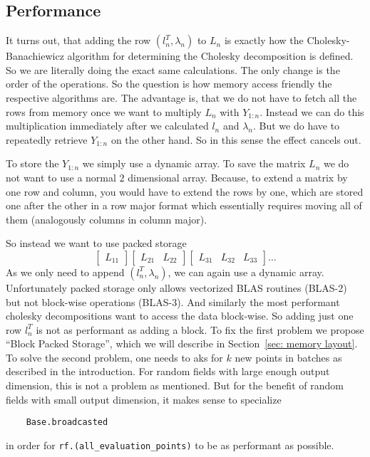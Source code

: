 \subsection{Performance}

It turns out, that adding the row \((l_n^T ,\lambda_n)\) to \(L_n\) is exactly
how the Cholesky-Banachiewicz algorithm for determining the Cholesky
decomposition is defined. So we are literally doing the exact same calculations.
The only change is the order of the operations. So the question is how memory
access friendly the respective algorithms are. The advantage is, that we do not
have to fetch all the rows from memory once we want to multiply
\(L_n\) with \(Y_{1:n}\). Instead we can do this multiplication immediately after
we calculated \(l_n\) and \(\lambda_n\). But we do have to repeatedly retrieve
\(Y_{1:n}\) on the other hand. So in this sense the effect cancels out.

To store the \(Y_{1:n}\) we simply use a dynamic array. To save the matrix \(L_n\)
we do not want to use a normal \(2\) dimensional array. Because, to extend a
matrix by one row and column, you would have to extend the rows by one, which
are stored one after the other in a row major format which essentially
requires moving all of them (analogously columns in column major).

So instead we want to use packed storage
\[
	\begin{bmatrix}
		L_{11}	
	\end{bmatrix}
	\begin{bmatrix}
		L_{21} & L_{22}
	\end{bmatrix}
	\begin{bmatrix}
		L_{31} & L_{32} & L_{33}
	\end{bmatrix}
	\dots
\]
As we only need to append \((l_n^T, \lambda_n)\), we can again use a dynamic
array. Unfortunately packed storage only allows vectorized BLAS routines
(BLAS-2) but not block-wise operations (BLAS-3). And similarly the most performant
cholesky decompositions want to access the data block-wise. So adding just one
row \(l_n^T\) is not as performant as adding a block. To fix the first problem
we propose ``Block Packed Storage'', which we will describe in Section~\ref{sec: memory
layout}. To solve the second problem, one needs to aks for \(k\) new points in
batches as described in the introduction. For random fields with large enough
output dimension, this is not a problem as mentioned. But for the benefit of
random fields with small output dimension, it makes sense to specialize
\begin{verbatim}
	Base.broadcasted
\end{verbatim}
in order for \texttt{rf.(all_evaluation_points)} to be as performant
as possible.

